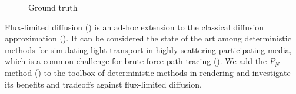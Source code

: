 {\begin{subfigure}{0.24\linewidth}
\vspace{-0.17in}
\caption{Ground truth}
\label{fig:teaser_gt}
\end{subfigure}%
\vspace{-0.1in}
\icaption
{
Flux-limited diffusion () is an ad-hoc extension to the classical diffusion approximation (). It can be considered the state of the art among deterministic methods for simulating light transport in highly scattering participating media, which is a common challenge for brute-force path tracing (). We add the $P_N$-method () to the toolbox of deterministic methods in rendering and investigate its benefits and tradeoffs against flux-limited diffusion.
}
\label{fig:teaser}
}

\maketitle




